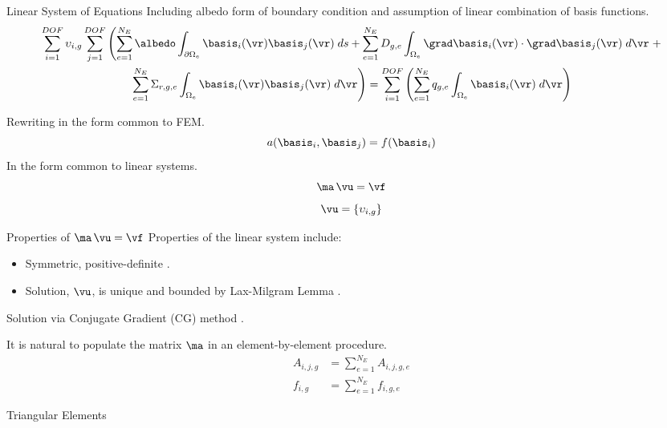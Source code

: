 \begin{frame}{Linear System of Equations}
  Including albedo form of boundary condition and assumption of linear
  combination of basis functions.
  \begin{multline}
    \label{eq:linear_equation}
    \sum_{i=1}^{DOF} \upsilon_{i,g} \sum_{j=1}^{DOF} \left(
      \sum_{e=1}^{N_E} \albedo \int_{\partial \Omega_e}
      \basis_i(\vr)  \basis_j(\vr) \;ds +
      \sum_{e=1}^{N_E} D_{g,e} 
      \int_{\Omega_e} \grad \basis_i(\vr) \cdot \grad \basis_j(\vr)\;d\vr
      \right.
      + \\
      \left.
      \sum_{e=1}^{N_E} \Sigma_{r,g,e}
      \int_{\Omega_e} \basis_i(\vr) \basis_j(\vr) \; d\vr \right) =
      \sum_{i=1}^{DOF} \left(
      \sum_{e=1}^{N_E} q_{g,e} 
      \int_{\Omega_e} \basis_i(\vr) \; d\vr \right)
  \end{multline}

  Rewriting in the form common to FEM.
  \begin{equation}
    \label{eq:fem_notation}
    a(\basis_i,\basis_j) = f(\basis_i)
  \end{equation}
  In the form common to linear systems.
  \begin{equation}
    \label{eq:matrix_notation}
    \ma \, \vu = \vf
  \end{equation}
  \[ \vu = \{\upsilon_{i,g}\} \]
\end{frame}

\begin{frame}{Properties of $\ma \, \vu = \vf$}
  Properties of the linear system include:
  \begin{itemize}
    \item Symmetric, positive-definite \cite{textbookhughes}.
    \item Solution, $\vu$, is unique and bounded by Lax-Milgram Lemma 
      \cite{textbookli}.
  \end{itemize}
  Solution via Conjugate Gradient (CG) method 
  \cite{Kelley1995IterativeEquations}.

  It is natural to populate the matrix $\ma$ in an element-by-element procedure.
  \begin{align}
    A_{i,j,g} &= \sum_{e=1}^{N_E} A_{i,j,g,e} \\
    f_{i,g} &=  \sum_{e=1}^{N_E} f_{i,g,e}
  \end{align}
\end{frame}

\begin{frame}{Triangular Elements}
  \begin{figure}
    \centering
    \vspace{0.2in}
    \label{fig:triangle_elements}
  \end{figure}
\end{frame}

